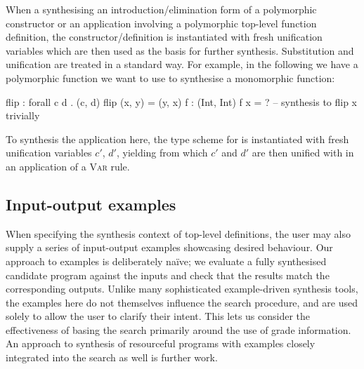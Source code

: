 When a synthesising an introduction/elimination form of a polymorphic
constructor or an application involving a polymorphic top-level function definition, the constructor/definition
is instantiated with fresh unification variables which are then used as the
basis for further synthesis. Substitution and unification are
treated in a standard way. For example, in the following we have a polymorphic
function we want to use to synthesise a monomorphic function:
%
\begin{granule}
flip : forall c d  . (c, d) %
flip (x, y) = (y, x)
f : (Int, Int) %
f x = ? -- synthesis to flip x trivially
\end{granule}
%
To synthesis the application  here, the type scheme for  is
instantiated with fresh unification variables $c'$, $d'$, yielding 
from which $c'$ and $d'$ are then unified with  in an application of a
\textsc{Var} rule.


\subsection{Input-output examples}

\label{sec:examples}

When specifying the synthesis context of top-level definitions, the user may also supply a series of
input-output examples showcasing desired behaviour. Our approach to examples is
deliberately na\"{i}ve; we evaluate a fully synthesised candidate program against
the inputs and check that the results match the corresponding outputs. Unlike many
sophisticated example-driven synthesis tools, the examples here do not themselves
influence the search procedure, and are used solely to allow the user to clarify their intent. This lets us consider the effectiveness of
basing the search primarily around the use of grade information. An approach to
synthesis of resourceful programs with examples closely integrated into the search
as well is further work.


